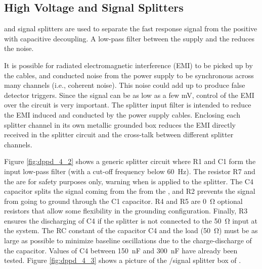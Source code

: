 
\subsection{High Voltage and Signal Splitters}
\label{sec:fddp-pd-4.2}

 and signal splitters 
are used to separate the fast  response signal from the positive  with capacitive decoupling. 
A low-pass filter between the  supply and the  reduces the noise.

It is possible for radiated electromagnetic interference (EMI) to be picked up by the cables, and conducted noise from the  power supply to be synchronous across many  channels (i.e., coherent noise). This noise could add up to produce false detector triggers. Since the  signal can be as low as a few \si{mV},
control of the EMI over the circuit is very important. The splitter  input filter is intended to reduce the EMI induced and conducted by the power supply cables. Enclosing each splitter channel in its own metallic grounded box reduces the EMI directly received in the splitter circuit and 
the cross-talk between different splitter channels.

Figure \ref{fig:dppd_4_2} shows a generic splitter circuit where R1 and C1 form the  input low-pass filter (with a cut-off frequency below \SI{60}{Hz}). The resistor R7 and the   are for safety purposes only, warning when  is applied to the splitter. The C4 capacitor splits the signal coming from the  from the , and R2 prevents the  signal from going to ground through the C1 capacitor. R4 and R5 are \SI{0}{\ohm} optional resistors that allow some flexibility in the grounding configuration. Finally, R3 ensures the discharging of C4 if the splitter is not connected to the \SI{50}{\ohm} input at the  system. The RC constant of the capacitor C4 and the load (\SI{50}{\ohm}) must be as large as possible to minimize baseline oscillations due to the charge-discharge of the capacitor. Values of C4 between \SI{150}{nF} and \SI{300}{nF} have already been tested. Figure \ref{fig:dppd_4_3} shows a picture of the /signal splitter box of .

